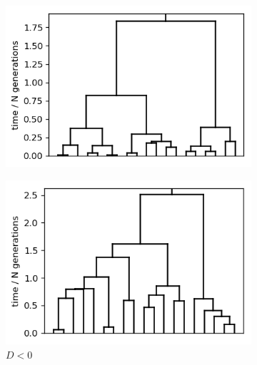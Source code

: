 \documentclass{article}
\begin{document}
\begin{figure}[h]
	\centering
	\begin{subfigure}[t]{0.305\linewidth}
		\centering
		\includegraphics[width = 1.0\linewidth, trim={0 0 0 0}, clip=true]{figures/drawtree_constant.png}
	\end{subfigure}
	\hspace{0.03\linewidth}
	\begin{subfigure}[t]{0.305\linewidth}
		\centering
		\includegraphics[width = 1.0\linewidth, trim={0 0 0 0}, clip=true]{figures/drawtree_increasing.png}
		\caption{$D < 0$}
	\end{subfigure}
	\hspace{0.03\linewidth}
	\begin{subfigure}[t]{0.305\linewidth}
		\centering

\end{subfigure}
\end{figure}
\end{document}
